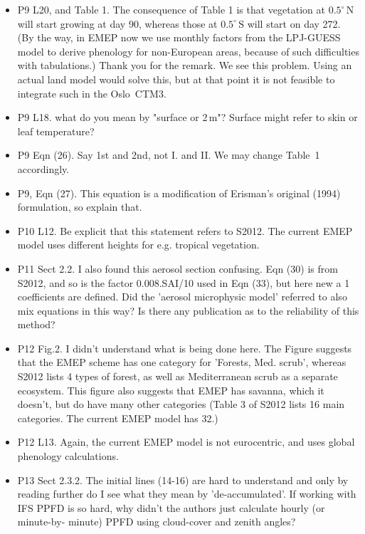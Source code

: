 \documentclass{scrartcl}
\begin{document}
\begin{itemize}
\item {\color{blue}P9 L20, and Table 1. The consequence of Table 1 is that vegetation at $0.5^\circ\,\mathrm{N}$
will start growing at day 90, whereas those at $0.5^\circ\,\mathrm{S}$ will start on day 272. (By the
way, in EMEP now we use monthly factors from the LPJ-GUESS model to derive
phenology for non-European areas, because of such difficulties with tabulations.)}
  Thank you for the remark. We see this problem. Using an actual land model would solve this, but at that point it is not feasible to integrate such in the Oslo~CTM3.
  
\item {\color{blue}P9 L18. what do you mean by "surface or 2\,m"? Surface might refer to skin or
  leaf temperature?}
  
\item {\color{blue}P9 Eqn (26). Say 1st and 2nd, not I. and II.}
  We may change Table~1 accordingly.
  
\item {\color{blue}P9, Eqn (27). This equation is a modification of Erisman’s original (1994) formulation, so explain that.}
\item {\color{blue}P10 L12. Be explicit that this statement refers to S2012. The current EMEP
model uses different heights for e.g. tropical vegetation.}
\item {\color{blue}P11 Sect 2.2. I also found this aerosol section confusing. Eqn (30) is from S2012,
and so is the factor 0.008.SAI/10 used in Eqn (33), but here new a 1 coefficients
are defined. Did the ’aerosol microphysic model’ referred to also mix equations
in this way? Is there any publication as to the reliability of this method?}
\item {\color{blue}P12 Fig.2. I didn’t understand what is being done here. The Figure suggests that
the EMEP scheme has one category for ’Forests, Med. scrub’, whereas S2012
lists 4 types of forest, as well as Mediterranean scrub as a separate ecosystem.
This figure also suggests that EMEP has savanna, which it doesn’t, but do have
many other categories (Table 3 of S2012 lists 16 main categories. The current
EMEP model has 32.)}
\item {\color{blue}P12 L13. Again, the current EMEP model is not eurocentric, and uses global
phenology calculations.}
\item {\color{blue}P13 Sect 2.3.2. The initial lines (14-16) are hard to understand and only by
reading further do I see what they mean by ’de-accumulated’. If working with
IFS PPFD is so hard, why didn’t the authors just calculate hourly (or minute-by-
minute) PPFD using cloud-cover and zenith angles?}

\end{itemize}
\newpage
\end{document}
